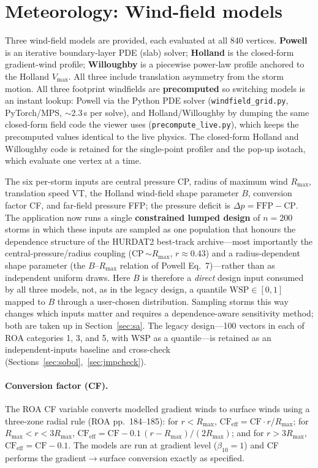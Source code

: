 \documentclass[11pt]{article}
\begin{document}
\section{Meteorology: Wind-field models}\label{sec:models}
Three wind-field models are provided, each evaluated at all 840 vertices.
\textbf{Powell} is an iterative boundary-layer PDE (slab) solver;
\textbf{Holland} is the closed-form gradient-wind profile; \textbf{Willoughby}
is a piecewise power-law profile anchored to the Holland $V_{\max}$. All three
include translation asymmetry from the storm motion. All three footprint
windfields are \textbf{precomputed} so switching models is an instant lookup:
Powell via the Python PDE solver (\texttt{windfield\_grid.py}, PyTorch/MPS,
$\sim$2.3\,s per solve), and Holland/Willoughby by dumping the same closed-form
field code the viewer uses (\texttt{precompute\_live.py}), which keeps the
precomputed values identical to the live physics. The closed-form Holland and
Willoughby code is retained for the single-point profiler and the pop-up isotach,
which evaluate one vertex at a time.

The six per-storm inputs are central pressure CP, radius of maximum wind $R_{\max}$,
translation speed VT, the Holland wind-field shape parameter $B$, conversion factor
CF, and far-field pressure FFP; the pressure deficit is $\Delta p=\text{FFP}-\text{CP}$.
The application now runs a single \textbf{constrained lumped design} of
$n=200$ storms in which these inputs are sampled as one population that honours the
dependence structure of the HURDAT2 best-track archive---most importantly the
central-pressure/radius coupling (CP\,$\sim R_{\max}$, $r\approx0.43$) and a
radius-dependent shape parameter (the $B$--$R_{\max}$ relation of Powell
Eq.~7)---rather than as independent uniform draws. Here $B$ is therefore a
\emph{direct} design input consumed by all three models, not, as in the legacy
design, a quantile $\text{WSP}\in[0,1]$ mapped to $B$ through a user-chosen
distribution. Sampling storms this way changes which inputs matter and requires a
dependence-aware sensitivity method; both are taken up in Section~\ref{sec:sa}.
The legacy design---100 vectors in each of ROA categories 1, 3, and 5, with WSP as a
quantile---is retained as an independent-inputs baseline and cross-check
(Sections~\ref{sec:sobol},~\ref{sec:jmpcheck}).

\paragraph{Conversion factor (CF).}
The ROA CF variable converts modelled gradient winds to surface winds using a
three-zone radial rule (ROA pp.~184--185): for $r<R_{\max}$,
$\text{CF}_{\text{eff}}=\text{CF}\cdot r/R_{\max}$; for
$R_{\max}\!<\!r\!<\!3R_{\max}$, $\text{CF}_{\text{eff}}=\text{CF}-0.1\,(r-R_{\max})/(2R_{\max})$;
and for $r>3R_{\max}$, $\text{CF}_{\text{eff}}=\text{CF}-0.1$. The models are run
at gradient level ($\beta_{10}=1$) and CF performs the gradient$\to$surface
conversion exactly as specified.
\end{document}
